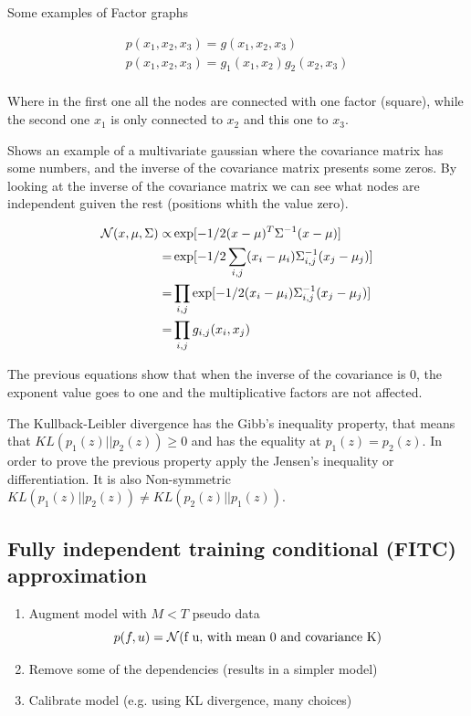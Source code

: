\documentclass[b5paper]{report}
\begin{document}
Some examples of Factor graphs

\begin{align}
  p(x_1, x_2, x_3) = g(x_1, x_2, x_3) \\
  p(x_1, x_2, x_3) = g_1(x_1, x_2)g_2(x_2, x_3) \\
\end{align}

Where in the first one all the nodes are connected with one factor (square),
while the second one $x_1$ is only connected to $x_2$ and this one to $x_3$.

Shows an example of a multivariate gaussian where the covariance matrix has
some numbers, and the inverse of the covariance matrix presents some zeros. By
looking at the inverse of the covariance matrix we can see what nodes are
independent guiven the rest (positions whith the value zero).

\begin{align}
  \operatorname*{\mathcal{N}}(x, \mu, \Sigma) \propto& \exp[-1/2 (x- \mu)^T \Sigma^{-1}(x- \mu)] \\
  =& \exp[-1/2 \sum_{i,j}(x_i - \mu_i)\Sigma_{i,j}^{-1}(x_j - \mu_j)] \\
  =& \prod_{i,j} \exp[-1/2 (x_i - \mu_i)\Sigma_{i,j}^{-1}(x_j - \mu_j)] \\
  =& \prod_{i,j} g_{i,j}(x_i, x_j)
\end{align}

The previous equations show that when the inverse of the covariance is 0, the
exponent value goes to one and the multiplicative factors are not affected.


The Kullback-Leibler divergence has the Gibb's inequality property, that means
that $KL(p_1(z) || p_2(z)) \ge 0$ and has the equality at $p_1(z) = p_2(z)$. In
order to prove the previous property apply the Jensen's inequality or
differentiation. It is also Non-symmetric $KL(p_1(z) || p_2(z)) \ne
KL(p_2(z) || p_1(z))$.

\subsection{Fully independent training conditional (FITC) approximation}

\begin{enumerate}
  \item Augment model with $M < T$ pseudo data
    \begin{equation}
      p(f, u) = \operatorname*{\mathcal{N}}(\text{f u, with mean 0 and covariance K})
    \end{equation}
  \item Remove some of the dependencies (results in a simpler model)
  \item Calibrate model (e.g. using KL divergence, many choices)
\end{enumerate}
\end{document}

